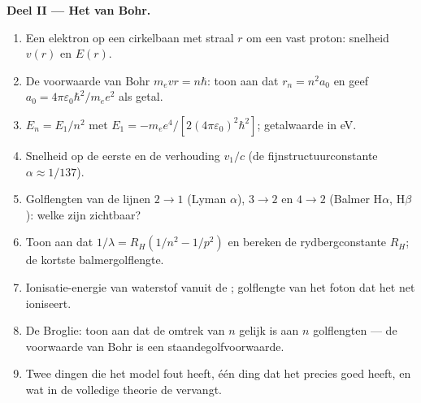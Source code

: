 \begin{problem}
\medskip
\noindent\textbf{Deel II --- Het  van Bohr.}
\begin{enumerate}[resume]
  \item Een elektron op een cirkelbaan met straal $r$ om een vast
        proton: snelheid $v(r)$ en  $E(r)$.
  \item De voorwaarde van Bohr $m_evr = n\hbar$: toon aan dat $r_n = n^2a_0$ en geef
        $a_0 = 4\pi\varepsilon_0\hbar^2/m_ee^2$ als getal.
  \item $E_n = E_1/n^2$ met $E_1 = -m_ee^4/[2(4\pi\varepsilon_0)^2\hbar^2]$;
        getalwaarde in eV.
  \item Snelheid op de eerste  en de verhouding $v_1/c$ (de
        fijnstructuurconstante $\alpha \approx 1/137$).
  \item Golflengten van de lijnen $2 \to 1$ (Lyman $\alpha$), $3 \to 2$ en
        $4 \to 2$ (Balmer H$\alpha$, H$\beta$): welke zijn zichtbaar?
  \item Toon aan dat $1/\lambda = R_H(1/n^2 - 1/p^2)$ en bereken de
        rydbergconstante $R_H$; de kortste balmergolflengte.
  \item Ionisatie-energie van waterstof vanuit de ; golflengte
        van het foton dat het net ioniseert.
  \item De Broglie: toon aan dat de omtrek van  $n$ gelijk is aan $n$
        golflengten --- de voorwaarde van Bohr is een staandegolfvoorwaarde.
  \item Twee dingen die het model fout heeft, één ding dat het precies
        goed heeft, en wat in de volledige theorie de  vervangt.
\end{enumerate}


\end{problem}
